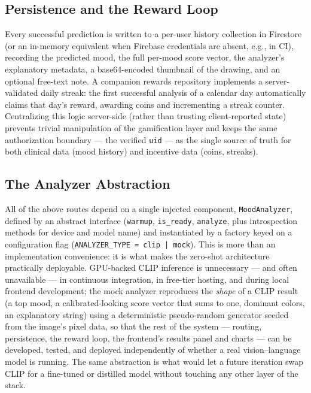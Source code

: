 \documentclass[10pt,twocolumn,letterpaper]{article}
\begin{document}
\subsection{Persistence and the Reward Loop}

Every successful prediction is written to a per-user history collection in Firestore (or an in-memory equivalent when Firebase credentials are absent, e.g., in CI), recording the predicted mood, the full per-mood score vector, the analyzer's explanatory metadata, a base64-encoded thumbnail of the drawing, and an optional free-text note. A companion rewards repository implements a server-validated daily streak: the first successful analysis of a calendar day automatically claims that day's reward, awarding coins and incrementing a streak counter. Centralizing this logic server-side (rather than trusting client-reported state) prevents trivial manipulation of the gamification layer and keeps the same authorization boundary --- the verified \texttt{uid} --- as the single source of truth for both clinical data (mood history) and incentive data (coins, streaks).

\subsection{The Analyzer Abstraction}

All of the above routes depend on a single injected component, \texttt{MoodAnalyzer}, defined by an abstract interface (\texttt{warmup}, \texttt{is\_ready}, \texttt{analyze}, plus introspection methods for device and model name) and instantiated by a factory keyed on a configuration flag (\texttt{ANALYZER\_TYPE = clip | mock}). This is more than an implementation convenience: it is what makes the zero-shot architecture practically deployable. GPU-backed CLIP inference is unnecessary --- and often unavailable --- in continuous integration, in free-tier hosting, and during local frontend development; the mock analyzer reproduces the \emph{shape} of a CLIP result (a top mood, a calibrated-looking score vector that sums to one, dominant colors, an explanatory string) using a deterministic pseudo-random generator seeded from the image's pixel data, so that the rest of the system --- routing, persistence, the reward loop, the frontend's results panel and charts --- can be developed, tested, and deployed independently of whether a real vision--language model is running. The same abstraction is what would let a future iteration swap CLIP for a fine-tuned or distilled model without touching any other layer of the stack.
\end{document}

